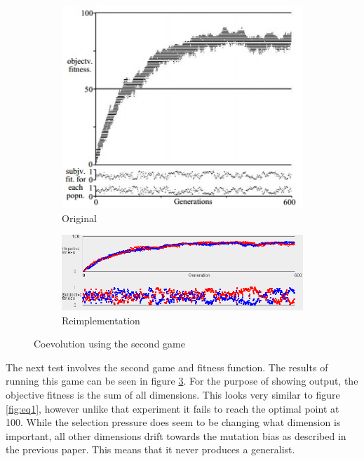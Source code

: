 \documentclass{article}
\begin{document}
\begin{figure}
\centering
\begin{subfigure}{.5\textwidth}
  \centering
  \includegraphics[width=.8\linewidth]{Screencaps/FocussingOrig}
  \caption{Original}
  \label{fig:eq2orig}
\end{subfigure}%
\begin{subfigure}{.5\textwidth}
  \centering
  \includegraphics[width=\linewidth]{Screencaps/FocussingReimp}
  \caption{Reimplementation}
  \label{fig:eq2reimp}
\end{subfigure}
\caption{Coevolution using the second game}
\label{fig:eq2}
\end{figure}

The next test involves the second game and fitness function. The results of running this game can be seen in figure \ref{fig:eq2}. For the purpose of showing output, the objective fitness is the sum of all dimensions. This looks very similar to figure \ref{fig:eq1}, however unlike that experiment it fails to reach the optimal point at 100. While the selection pressure does seem to be changing what dimension is important, all other dimensions drift towards the mutation bias as described in the previous paper\cite{watson2001}. This means that it never produces a generalist.
\end{document}
